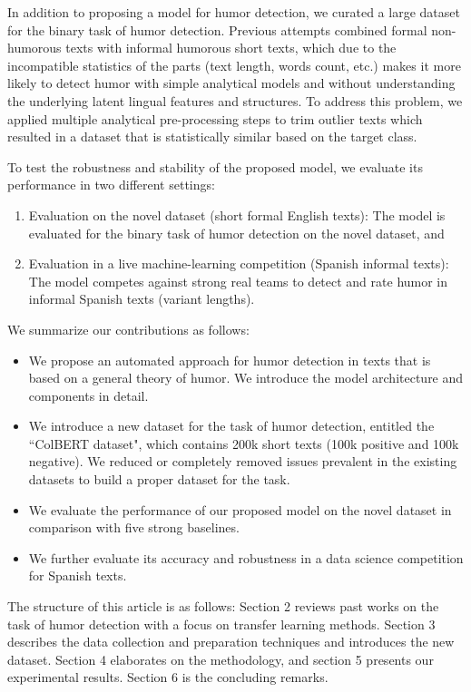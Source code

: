 \documentclass{article}
\begin{document}
In addition to proposing a model for humor detection, we curated a large dataset for the binary task of humor detection. Previous attempts combined formal non-humorous texts with informal humorous short texts, which due to the incompatible statistics of the parts (text length, words count, etc.) makes it more likely to detect humor with simple analytical models and without understanding the underlying latent lingual features and structures. To address this problem, we applied multiple analytical pre-processing steps to trim outlier texts which resulted in a dataset that is statistically similar based on the target class.

To test the robustness and stability of the proposed model, we evaluate its performance in two different settings: 
\begin{enumerate}
    \item Evaluation on the novel dataset (short formal English texts): The model is evaluated for the binary task of humor detection on the novel dataset, and 
    \item Evaluation in a live machine-learning competition (Spanish informal texts): The model competes against strong real teams to detect and rate humor in informal Spanish texts (variant lengths).
\end{enumerate}

We summarize our contributions as follows:
\begin{itemize}
    \item We propose an automated approach for humor detection in texts that is based on a general theory of humor. We introduce the model architecture and components in detail.
    \item We introduce a new dataset for the task of humor detection, entitled the “ColBERT dataset", which contains 200k short texts (100k positive and 100k negative). We reduced or completely removed issues prevalent in the existing datasets to build a proper dataset for the task.
    \item We evaluate the performance of our proposed model on the novel dataset in comparison with five strong baselines.
    \item We further evaluate its accuracy and robustness in a data science competition for Spanish texts.
\end{itemize}

The structure of this article is as follows: Section 2 reviews past works on the task of humor detection with a focus on transfer learning methods. Section 3 describes the data collection and preparation techniques and introduces the new dataset. Section 4 elaborates on the methodology, and section 5 presents our experimental results. Section 6 is the concluding remarks.
\end{document}

